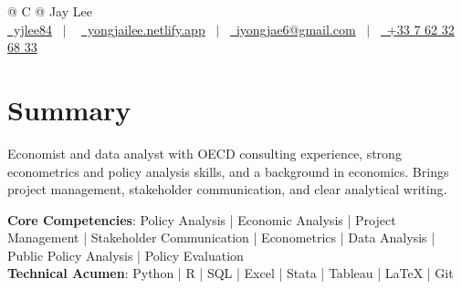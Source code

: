\documentclass[a4paper,12pt]{article}
\begin{document}
\pagestyle{empty} 



\begin{tabularx}{\linewidth}{@{} C @{}}
\Huge{Jay Lee} \\[7.5pt]
\href{https://github.com/yjlee84}{\raisebox{-0.05\height}\faGithub\ yjlee84} \ $|$ \ 
\href{https://yongjailee.netlify.app}{\raisebox{-0.05\height}\faGlobe \ yongjailee.netlify.app} \ $|$ \ 
\href{mailto:email@mysite.com}{\raisebox{-0.05\height}\faEnvelope \ iyongjae6@gmail.com} \ $|$ \ 
\href{tel:+000000000000}{\raisebox{-0.05\height}\faMobile \ +33 7 62 32 68 33} \\
\end{tabularx}


\section{Summary}
Economist and data analyst with OECD consulting experience, strong econometrics and policy analysis skills, and a background in economics. Brings project management, stakeholder communication, and clear analytical writing.

\textbf{Core Competencies}: Policy Analysis | Economic Analysis | Project Management | Stakeholder Communication | Econometrics | Data Analysis | Public Policy Analysis | Policy Evaluation\\
\textbf{Technical Acumen}: Python | R | SQL | Excel | Stata | Tableau | \LaTeX{} | Git
\end{document}
